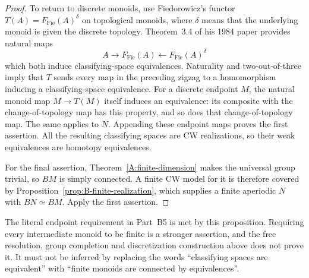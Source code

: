 \begin{proof}
To return to discrete monoids, use Fiedorowicz's functor
$T(A)=F_{\mathrm{Fie}}(A)^\delta$ on topological monoids, where
$\delta$ means that the underlying monoid is given the discrete
topology.  Theorem~3.4 of his 1984 paper \cite{Fiedorowicz1984B} provides natural maps
\[
 A\longrightarrow F_{\mathrm{Fie}}(A)
       \longleftarrow F_{\mathrm{Fie}}(A)^\delta
\]
which both induce classifying-space equivalences.  Naturality and
two-out-of-three imply that $T$ sends every map in the preceding
zigzag to a homomorphism inducing a classifying-space equivalence.
For a discrete endpoint $M$, the natural monoid map $M\to T(M)$
itself induces an equivalence: its composite with the change-of-topology
map has this property, and so does that change-of-topology map.
The same applies to $N$.  Appending these endpoint maps proves the
first assertion.  All the resulting classifying spaces are CW
realizations, so their weak equivalences are homotopy equivalences.

For the final assertion, Theorem~\ref{A:finite-dimension} makes the
universal group trivial, so $BM$ is simply connected.
A finite CW model for it is therefore covered
by Proposition~\ref{prop:B-finite-realization}, which supplies a
finite aperiodic $N$ with $BN\simeq BM$.  Apply the first assertion.
\end{proof}

\begin{remark}\label{rem:B-finite-intermediate}
The literal endpoint requirement in Part~B5 is met by this proposition.  Requiring
every intermediate monoid to be finite is a stronger assertion, and
the free resolution, group completion and discretization construction
above does not prove it.  It must not be inferred by replacing the
words ``classifying spaces are equivalent'' with ``finite monoids are
connected by equivalences''.
\end{remark}

